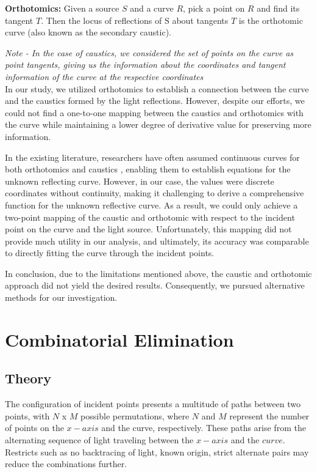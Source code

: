 \documentclass[12pt,a4paper,twoside]{report}
\begin{document}
\textbf{Orthotomics:}  Given a source $S$ and a curve $R$, pick a point on $R$ and find its tangent $T$. Then the locus of reflections of S about tangents $T$ is the orthotomic curve (also known as the secondary caustic). \cite{ortho} 

\textit{Note - In the case of caustics, we considered the set of points on the curve as point tangents, giving us the information about the coordinates and tangent information of the curve at the respective coordinates} \\

In our study, we utilized orthotomics to establish a connection between the curve and the caustics formed by the light reflections. However, despite our efforts, we could not find a one-to-one mapping between the caustics and orthotomics with the curve while maintaining a lower degree of derivative value for preserving more information.

In the existing literature, researchers have often assumed continuous curves for both orthotomics and caustics \cite{giblin}\cite{russian}, enabling them to establish equations for the unknown reflecting curve. However, in our case, the values were discrete coordinates without continuity, making it challenging to derive a comprehensive function for the unknown reflective curve. As a result, we could only achieve a two-point mapping of the caustic and orthotomic with respect to the incident point on the curve and the light source. Unfortunately, this mapping did not provide much utility in our analysis, and ultimately, its accuracy was comparable to directly fitting the curve through the incident points.

In conclusion, due to the limitations mentioned above, the caustic and orthotomic approach did not yield the desired results. Consequently, we pursued alternative methods for our investigation.

\newpage
\section{Combinatorial Elimination}

\subsection{Theory}

The configuration of incident points presents a multitude of paths between two points, with $N$ x $M$ possible permutations, where $N$ and $M$ represent the number of points on the $x-axis$ and the curve, respectively. These paths arise from the alternating sequence of light traveling between the $x-axis$ and the $curve$. Restricts such as no backtracing of light, known origin, strict alternate pairs may reduce the combinations further.
\end{document}
